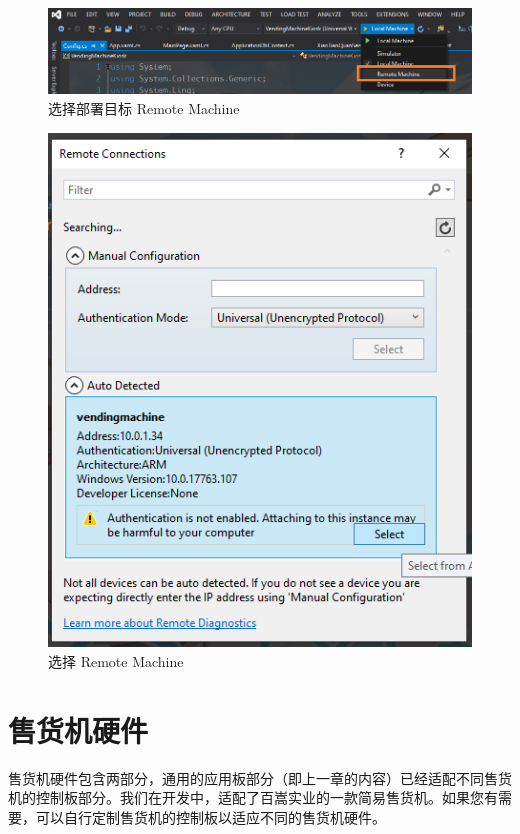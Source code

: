 \documentclass[a4paper,11pt]{article}
\theoremstyle{definition}
\begin{document}
    \begin{figure}[htbp]
    \minipage[b][][b]{\textwidth}
        \includegraphics[width=\linewidth]{remotemachine.png}
        \caption{选择部署目标 Remote Machine}
        \label{fig:remotemachine}
    \endminipage\hfill
    \end{figure}

    \begin{figure}[htbp]
    \minipage[b][][b]{\textwidth}
        \includegraphics{remoteselection.png}
        \caption{选择 Remote Machine}
        \label{fig:remotemachineselection}
    \endminipage\hfill
    \end{figure}

\section{售货机硬件}

售货机硬件包含两部分，通用的应用板部分（即上一章的内容）已经适配不同售货机的控制板部分。我们在开发中，适配了百嵩实业的一款简易售货机。如果您有需要，可以自行定制售货机的控制板以适应不同的售货机硬件。
\end{document}
